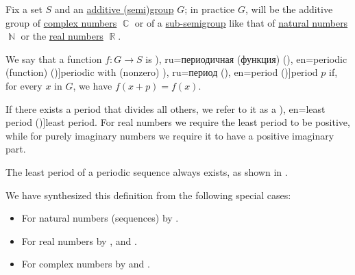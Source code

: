 \begin{definition}\label{def:periodic_function}
  Fix a set \( S \) and an \hyperref[con:additive_semigroup]{additive (semi)group} \( G \); in practice \( G \), will be the additive group of \hyperref[def:complex_numbers]{complex numbers} \( \BbbC \) or of a \hyperref[def:semigroup/submodel]{sub-semigroup} like that of \hyperref[def:natural_numbers]{natural numbers} \( \BbbN \) or the \hyperref[def:real_numbers]{real numbers} \( \BbbR \).

  We say that a function \( f: G \to S \) is \term[bg=периодична (функция) (\cite[318]{ИлинСадовничиСендов1989АнализТом2}), ru=периодичная (функция) (\cite[371]{Фихтенгольц1968ОсновыАнализаТом2}), en=periodic (function) (\cite[def. 5.1.1]{Tao2022AnalysisII})]{periodic} with (nonzero) \term[bg=период (\cite[318]{ИлинСадовничиСендов1989АнализТом2}), ru=период (\cite[371]{Фихтенгольц1968ОсновыАнализаТом2}), en=period (\cite[def. 5.1.1]{Tao2022AnalysisII})]{period} \( p \) if, for every \( x \) in \( G \), we have \( f(x + p) = f(x) \).

  If there exists a period that divides all others, we refer to it as a \term[ru=основной период (\cite[102]{Маркушевич1967АналитическиеФункцииТом1}), en=least period (\cite[def. 8.3]{LidlNiederreiter1997FiniteFields})]{least period}. For real numbers we require the least period to be positive, while for purely imaginary numbers we require it to have a positive imaginary part.
\end{definition}
\begin{comments}
  \item The least period of a periodic sequence always exists, as shown in .
  \item We have synthesized this definition from the following special cases:
  \begin{itemize}
    \item For natural numbers (sequences) by .
    \item For real numbers by ,  and .
    \item For complex numbers by  and .
  \end{itemize}
\end{comments}

